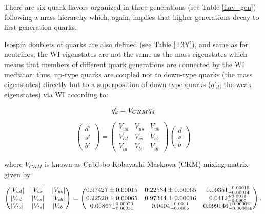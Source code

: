 There are six quark flavors organized in three generations (see Table \ref{flav_gen}) following a mass hierarchy which, again, implies that higher generations decay to first generation quarks.

Isospin doublets of quarks are also defined (see Table \ref{T3Y}), and same as for neutrinos, the WI eigenstates are not the same as the mass eigenstates which means that members of different quark generations are connected by the WI mediator; thus, ${\textrm{up-type}}$ quarks are coupled not to down-type quarks (the mass eigenstates) directly but to a superposition of down-type quarks ($q'_d$; the weak eigenstates) via WI according to:

\begin{equation}
\centering
q'_d = V_{CKM}q_d
\end{equation}

\begin{equation}
\begin{pmatrix}
d'\\ s'\\ b'
\end{pmatrix}
 =
\begin{pmatrix}
V_{ud} & V_{us} & V_{ub}\\ V_{cd} & V_{cs} & V_{cb}\\ V_{td} & V_{ts} & V_{tb}\end{pmatrix}
\begin{pmatrix}
d\\s\\b
\end{pmatrix}
\label{eq:qmixing}
\end{equation}

\noindent where $V_{CKM}$ is known as Cabibbo-Kobayashi-Maskawa (CKM) mixing matrix\cite{C,KM} given by  

\begin{equation}
\small
\begin{pmatrix}
|V_{ud}| & |V_{us}| & |V_{ub}| \\
|V_{cd}| & |V_{cs}| & |V_{cb}| \\
|V_{td}| & |V_{ts}| & |V_{tb}|
\end{pmatrix} = \begin{pmatrix}
0.97427 \pm 0.00015 & 0.22534 \pm 0.00065 & 0.00351^{+0.00015}_{-0.00014} \\
0.22520 \pm 0.00065 & 0.97344 \pm 0.00016 & 0.0412^{+0.0011}_{-0.0005} \\
0.00867^{+0.00029}_{-0.00031} & 0.0404^{+0.0011}_{-0.0005} & 0.999146^{+0.000021}_{-0.000046}
\end{pmatrix}.
\label{eq:ckm}
\end{equation}

